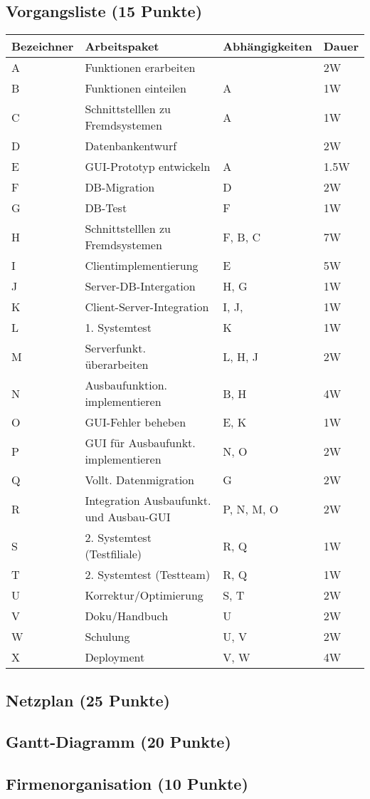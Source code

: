 \documentclass{scrartcl}
\begin{document}
\subsection{Vorgangsliste (15 Punkte)}
\begin{center}
   \begin{tabular}{llll}
      \toprule
      Bezeichner & Arbeitspaket & Abhängigkeiten & Dauer\\
      \toprule
      \rowcolor{gray!10}
      A & Funktionen erarbeiten & & 2W\\
      B & Funktionen einteilen & A & 1W\\
      C & Schnittstelllen zu Fremdsystemen & A & 1W\\
      D & Datenbankentwurf & & 2W \\
      E & GUI-Prototyp entwickeln & A & 1.5W\\
      F & DB-Migration & D & 2W \\
      G & DB-Test & F& 1W \\
      H & Schnittstelllen zu Fremdsystemen & F, B, C & 7W \\
      I & Clientimplementierung & E & 5W \\
      J & Server-DB-Intergation & H, G& 1W \\
      K & Client-Server-Integration & I, J, & 1W \\
      L & 1. Systemtest & K & 1W \\
      M & Serverfunkt. überarbeiten & L, H, J& 2W \\
      N & Ausbaufunktion.  implementieren & B, H & 4W\\
      O & GUI-Fehler beheben & E, K & 1W \\
      P & GUI für Ausbaufunkt. implementieren & N, O & 2W \\
      Q & Vollt. Datenmigration & G & 2W \\
      R & Integration Ausbaufunkt.  und Ausbau-GUI & P, N, M, O & 2W \\
      S & 2. Systemtest (Testfiliale) & R, Q & 1W \\
      T & 2. Systemtest (Testteam) & R, Q & 1W \\
      U & Korrektur/Optimierung & S, T & 2W \\
      V & Doku/Handbuch & U & 2W \\
      W & Schulung & U, V & 2W \\
      X & Deployment &  V, W & 4W\\
      \bottomrule
   \end{tabular}
\end{center}
\subsection{Netzplan (25 Punkte)}
\subsection{Gantt-Diagramm (20 Punkte)}
\subsection{Firmenorganisation (10 Punkte)}
\end{document}
